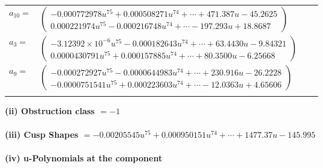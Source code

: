 \documentclass[1p]{elsarticle_modified}
\theoremstyle{definition}
\begin{document}
\begin{tabular}{m{7pt} m{180pt} m{7pt} m{180pt} }
\flushright $a_{10}=$&$\begin{pmatrix}-0.000772978 u^{75}+0.000508271 u^{74}+\cdots+471.387 u-45.2625\\0.000221974 u^{75}-0.000216748 u^{74}+\cdots-197.293 u+18.8687\end{pmatrix}$ \\
\flushright $a_{3}=$&$\begin{pmatrix}-3.12392\times10^{-6} u^{75}-0.000182643 u^{74}+\cdots+63.4430 u-9.84321\\0.0000430791 u^{75}+0.000157885 u^{74}+\cdots+80.3500 u-6.25668\end{pmatrix}$ \\
\flushright $a_{9}=$&$\begin{pmatrix}-0.000272927 u^{75}-0.0000644983 u^{74}+\cdots+230.916 u-26.2228\\-0.0000751541 u^{75}+0.000223603 u^{74}+\cdots-12.0363 u+4.65606\end{pmatrix}$\\&\end{tabular}
\flushleft \textbf{(ii) Obstruction class $= -1$}\\~\\
\flushleft \textbf{(iii) Cusp Shapes $= -0.00205545 u^{75}+0.000950151 u^{74}+\cdots+1477.37 u-145.995$}\\~\\
\newpage\renewcommand{\arraystretch}{1}
\flushleft \textbf{(iv) u-Polynomials at the component}\newline \\
\end{document}
